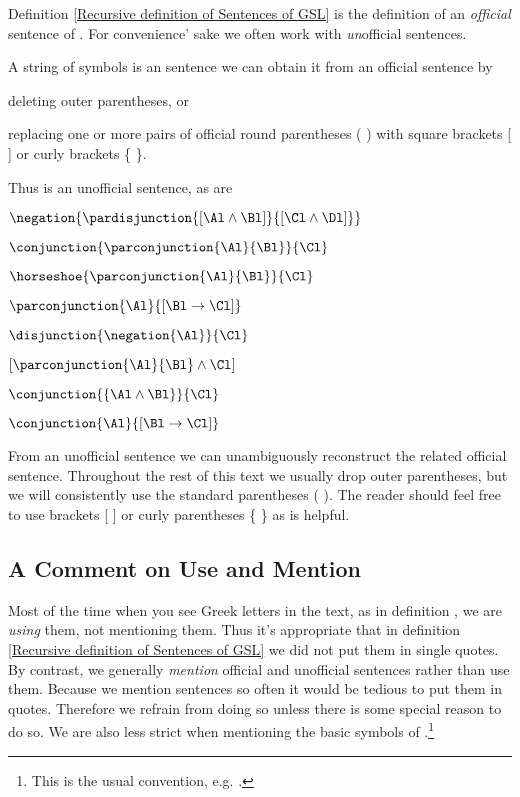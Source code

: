 Definition \ref{Recursive definition of Sentences of GSL} is the definition of an \emph{official} sentence of \GSL{}.
For convenience' sake we often work with \emph{un}official sentences. 
\begin{majorILnc}{}
A string of symbols is an  sentence \Iff we can obtain it from an official sentence by
\begin{cenumerate}
\item deleting outer parentheses, or
\item replacing one or more pairs of official round parentheses ( ) with square brackets [ ] or curly brackets \{ \}.
\end{cenumerate}
\end{majorILnc}
\noindent{}Thus \mention{$\conjunction{\Al}{\conjunction{\Bl}{\Cl}}$} is an unofficial sentence, as are
\begin{multicols}{2}
\begin{smenumerate}
\item\label{usex1} $\negation{\pardisjunction{[\Al\wedge\Bl]}{[\Cl\wedge\Dl]}}$
\item $\conjunction{\parconjunction{\Al}{\Bl}}{\Cl}$
\item $\horseshoe{\parconjunction{\Al}{\Bl}}{\Cl}$
\item $\parconjunction{\Al}{[\Bl\rightarrow\Cl]}$
\item $\disjunction{\negation{\Al}}{\Cl}$
\item $[\parconjunction{\Al}{\Bl}\wedge\Cl]$
\item $\conjunction{\{\Al\wedge\Bl\}}{\Cl}$
\item\label{usexL} $\conjunction{\Al}{[\Bl\rightarrow\Cl]}$
\end{smenumerate}
\end{multicols}
\noindent{}From an unofficial sentence we can unambiguously reconstruct the related official sentence. 
Throughout the rest of this text we usually drop outer parentheses, but we will consistently use the standard parentheses ( ). 
The reader should feel free to use brackets [ ] or curly parentheses \{ \} as is helpful. 

\subsection{A Comment on Use and Mention}\label{use mention comment}

Most of the time when you see Greek letters in the text, as in definition , we are \emph{using} them, not mentioning them. 
Thus it's appropriate that in definition \ref{Recursive definition of Sentences of GSL} we did not put them in single quotes.
By contrast, we generally \emph{mention} official and unofficial \GSL{} sentences rather than use them.
Because we mention \GSL{} sentences so often it would be tedious to put them in quotes. 
Therefore we refrain from doing so unless there is some special reason to do so.  
We are also less strict when mentioning the basic symbols of \GSL{}.\footnote{This is the usual convention, e.g. \citealt[7]{Hodges2001}.}

